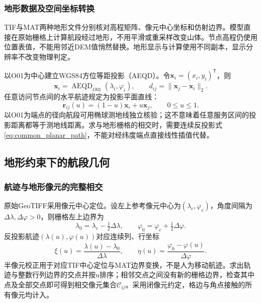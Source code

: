 

\subsubsection{地形数据及空间坐标转换}
TIF与MAT两种地形文件分别核对高程矩阵、像元中心坐标和仿射边界。模型直接在原始栅格上计算航段经过地形，不用平滑或重采样改变山体。节点高程仍使用位置表值，不能用邻近DEM值悄然替换。地形显示与计算使用不同副本，显示分辨率不改变物理判定。

以O01为中心建立WGS84方位等距投影（AEQD）\cite{snyder1987}。令$\boldsymbol x_i=(x_i,y_i)^{\mathsf T}$，则
\begin{equation}
\boldsymbol x_i=\operatorname{AEQD}_{O01}(\lambda_i,\varphi_i),\qquad
 d_{ij}=\|\boldsymbol x_j-\boldsymbol x_i\|_2.
\label{eq:common_projection}
\end{equation}
任意访问节点间的水平航迹规定为投影平面直线：
\begin{equation}
\boldsymbol r_{ij}(u)=(1-u)\boldsymbol x_i+u\boldsymbol x_j,\qquad 0\le u\le1.
\label{eq:common_planar_path}
\end{equation}
以O01为端点的径向航段可用椭球测地线独立核验；这不意味着任意服务区间的投影距离都等于测地线距离。求与地形栅格的相交时，需要连续反投影式\eqref{eq:common_planar_path}，不能对经纬度端点直接线性插值代替。

\subsection{地形约束下的航段几何}
\subsubsection{航迹与地形像元的完整相交}
原始GeoTIFF采用像元中心定位。设左上参考像元中心为$(\lambda_c,\varphi_c)$，角度间隔为$\Delta\lambda,\Delta\varphi>0$，则栅格左上边界为
\begin{equation}
\lambda_0=\lambda_c-\tfrac12\Delta\lambda,\qquad
\varphi_0=\varphi_c+\tfrac12\Delta\varphi.
\label{eq:common_half_pixel}
\end{equation}
反投影航迹$(\lambda(u),\varphi(u))$对应连续列、行坐标
\begin{equation}
\xi(u)=\frac{\lambda(u)-\lambda_0}{\Delta\lambda},\qquad
\eta(u)=\frac{\varphi_0-\varphi(u)}{\Delta\varphi}.
\label{eq:common_raster_coordinates}
\end{equation}
半像元校正用于对应TIF中心定位与MAT边界变换，不是人为移动航迹。求出轨迹与整数行列边界的交点并按$u$排序；相邻交点之间没有新的栅格边界，检查其中点及全部交点即可得到相交像元集合$\mathcal C_{ij}$。采用闭像元约定，格边与角点接触的所有像元均计入。

